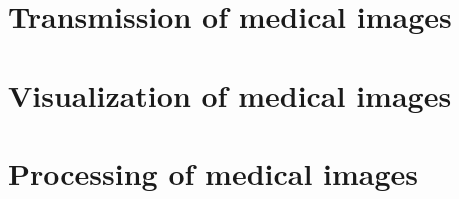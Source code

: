 \documentclass{report}
\begin{document}
\part{Transmission of medical images}





\part{Visualization of medical images}




\part{Processing of medical images}





%

\printglossary[type=\acronymtype]

\printbibliography[heading=bibintoc]
%
%
\end{document}
